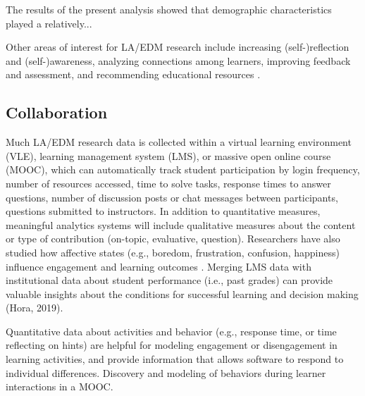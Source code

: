 \documentclass[sigconf]{acmart}
\begin{document}
The results of the present analysis showed that demographic 
characteristics played a relatively...  

Other areas of interest for LA/EDM research include 
increasing (self-)reflection and (self-)awareness, analyzing connections among 
learners, improving feedback and assessment, and recommending educational 
resources \cite{lang17, lester19, papamitsiou14}.




\subsection{Collaboration}

Much LA/EDM research data is collected within a virtual learning 
environment (VLE), learning management system (LMS), or massive open online 
course (MOOC), which can automatically track student participation by login 
frequency, number of resources accessed, time to solve tasks, response times 
to answer questions, number of discussion posts or chat messages between 
participants, questions submitted to instructors. In addition to quantitative 
measures, meaningful analytics systems will include qualitative measures about 
the content or type of contribution (on-topic, evaluative, question). 
Researchers have also studied how affective states (e.g., boredom, 
frustration, confusion, happiness) influence engagement and learning outcomes 
\cite{pardos14}. Merging LMS data with institutional data about student 
performance (i.e., past grades) can provide valuable insights about the 
conditions for successful learning and decision making (Hora, 2019). 


Quantitative data about activities and behavior (e.g., response time, or 
time reflecting on hints) are helpful for modeling engagement or disengagement 
in learning activities, and provide information that allows software to respond 
to individual differences. Discovery and modeling of behaviors during learner 
interactions in a MOOC. 
\end{document}
